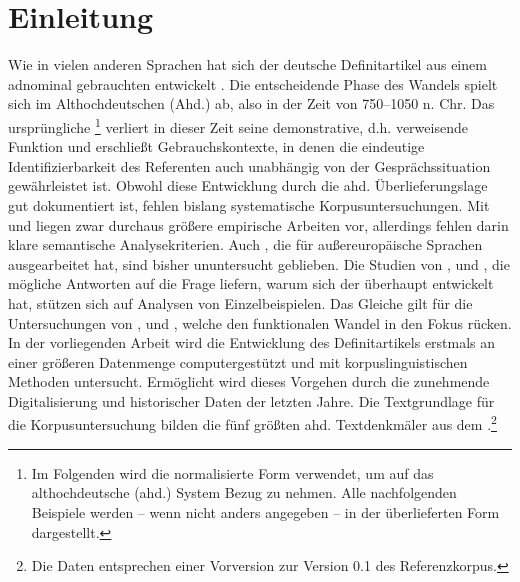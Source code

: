 \chapter{Einleitung}

Wie in vielen anderen Sprachen hat sich der deutsche Definitartikel aus einem adnominal gebrauchten  entwickelt  \parencite{Oubouzar1992,Szczepaniak2011a}. Die entscheidende Phase des Wandels spielt sich im Althochdeutschen (Ahd.) ab, also in der Zeit von 750--1050 n. Chr. Das ursprüngliche   \footnote{Im Folgenden wird die normalisierte Form  verwendet, um auf das althochdeutsche (ahd.) System Bezug zu nehmen. Alle nachfolgenden Beispiele werden -- wenn nicht anders angegeben -- in der überlieferten Form dargestellt.} verliert in dieser Zeit seine demonstrative, d.h. verweisende Funktion und erschließt Gebrauchskontexte, in denen die eindeutige Identifizierbarkeit des Referenten auch unabhängig von der Gesprächssituation gewährleistet ist. Obwohl diese Entwicklung durch die ahd. Überlieferungslage gut dokumentiert ist, fehlen bislang systematische Korpusuntersuchungen.  Mit \textcite{Hodler1954} und \textcite{Oubouzar1989,Oubouzar1992,Oubouzar1997a} liegen zwar durchaus größere empirische Arbeiten vor, allerdings fehlen darin klare semantische Analysekriterien. Auch  \parencite{Heine2002a}, die \textcite{Himmelmann1997} für außereuropäische Sprachen ausgearbeitet hat, sind bisher ununtersucht geblieben. Die Studien von \textcite{Abraham1997}, \textcite{Philippi1997} und \textcite{Leiss2000}, die mögliche Antworten auf die Frage liefern, warum sich der  überhaupt entwickelt hat, stützen sich auf Analysen von Einzelbeispielen. Das Gleiche gilt für die Untersuchungen von \textcite{Demske2001}, \textcite{Kraiss2012,Kraiss2014} und \textcite{Schlachter2015}, welche den funktionalen Wandel in den Fokus rücken.
In der vorliegenden Arbeit wird die Entwicklung des Definitartikels  erstmals an einer größeren Datenmenge computergestützt und mit korpuslinguistischen Methoden  untersucht. Ermöglicht wird dieses Vorgehen durch die zunehmende Digitalisierung und  historischer Daten der letzten Jahre. Die Textgrundlage für die Korpusuntersuchung  bilden die fünf größten ahd. Textdenkmäler aus dem   \parencite{Donhauser2014}.\footnote{Die Daten entsprechen einer Vorversion zur Version 0.1 des Referenzkorpus.}

